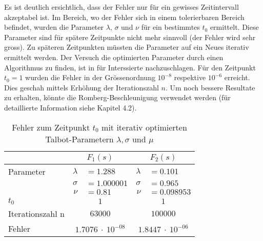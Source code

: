

Es ist deutlich ersichtlich, dass der Fehler nur für ein gewisses
Zeitintervall akzeptabel ist.
Im Bereich, wo der Fehler sich in einem
tolerierbaren Bereich befindet, wurden die Parameter $\lambda$,
$\sigma$ und $\nu$ für ein bestimmtes $t_{0}$ ermittelt.
Diese Parameter sind für spätere Zeitpunkte nicht mehr sinnvoll (der Fehler wird sehr gross).
Zu späteren Zeitpunkten müssten die Parameter auf ein Neues iterativ
ermittelt werden.
Der Versuch die optimierten Parameter durch einen Algorithmus zu
finden, ist in \cite{laplace:talbot} für Interssierte nachzuschlagen.
Für den Zeitpunkt $t_{0}=1$ wurden die Fehler in der Grössenordnung
$10^{-8}$ respektive $10^{-6}$ erreicht.
Dies geschah mittels Erhöhung der Iterationszahl $n$. Um noch bessere
Resultate zu erhalten, könnte die Romberg-Beschleunigung verwendet
%
werden (für detaillierte Information siehe Kapitel 4.2).

\begin{table}
\centering
\begin{tabular}{l|r@{\hskip2pt}l|r@{\hskip2pt}l}
& \multicolumn{2}{c|}{$F_{1}(s)$} & \multicolumn{2}{c}{$F_{2}(s)$}\\
\hline
Parameter & $\lambda$&$=1.288$ & $\lambda$&$=0.101$ \\
 & $\sigma$ &$=1.000001$ & $\sigma$&$=0.965$ \\
 & $\nu$ & $=0.81$ & $\nu$ & $=0.098953$ \\
\hline
$t_{0}$ & \multicolumn{2}{c|}{$1$} & \multicolumn{2}{c}{$1$} \\
\hline
Iterationszahl n & \multicolumn{2}{c|}{$63000$} & \multicolumn{2}{c}{$100000$} \\
\hline
Fehler & \multicolumn{2}{c|}{$1.7076~\cdot~10^{-08}$} & \multicolumn{2}{c}{$1.8447~\cdot~10^{-06}$} \\
\end{tabular}
\caption{Fehler zum Zeitpunkt $t_{0}$ mit iterativ optimierten Talbot-Parametern $\lambda, \sigma$ und $\mu$
\label{laplace:parametertabelle2}}
\end{table}


